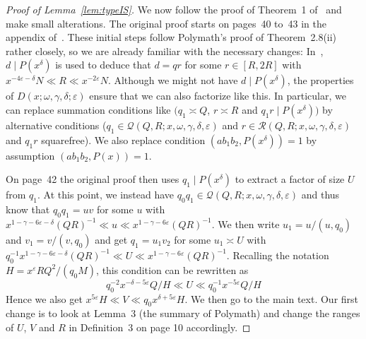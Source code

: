 \documentclass{amsart}
\numberwithin{equation}{section}
\begin{document}
\begin{proof}[Proof of Lemma~\ref{lem:typeIS}]
We now follow the proof of Theorem~1 of~\cite{Stadlmann:2023:PAP} and make   small alterations. The original proof starts on  pages~40 to~43 in the appendix of~\cite{Stadlmann:2023:PAP}. These initial steps follow Polymath's proof of Theorem~2.8(ii) rather closely, so we are already familiar with the necessary changes: In~\cite{Stadlmann:2023:PAP},  $d \mid P(x^\delta)$ is used to deduce that $d=qr$ for some $r \in [R,2R]$ with $x^{-4\varepsilon-\delta}N \ll R \ll x^{-2\varepsilon}N$. Although we might not have   $d \mid P(x^\delta)$,   the properties of $D(x;\omega,\gamma,\delta;\varepsilon)$  ensure that we can also factorize like this. In particular, we  can  replace summation conditions like $(q_1 \asymp Q$, $r \asymp R$ and $q_1r \mid P(x^\delta))$ by alternative conditions ($q_1 \in  \mathcal{Q}(Q,R;x,\omega,\gamma,\delta,\varepsilon)$ and $r \in \mathcal{R}(Q,R;x,\omega,\gamma,\delta,\varepsilon)$ and $q_1r$ squarefree).  We also replace condition $(ab_1b_2,P(x^\delta))=1$ by   assumption $(ab_1b_2, P(x))=1$.

\medskip On page~42 the original proof then uses $q_1 \mid P(x^\delta)$ to extract a factor of size $U$ from $q_1$. At this point, we instead have  $q_0q_1 \in  \mathcal{Q}(Q,R;x,\omega,\gamma,\delta,\varepsilon)$ and thus know that $q_0q_1 = u  v $ for some $u$ with  $ x^{1-\gamma-6\varepsilon-\delta}   (QR)^{-1} \ll u \ll x^{1-\gamma-6\varepsilon}   (QR)^{-1}$. We then write $u_1 =u/(u,q_0)$ and $v_1=v/(v,q_0)$ and get $q_1 = u_1 v_2$    for some $u_1 \asymp U$  with  $ q_0^{-1}x^{1-\gamma-6\varepsilon-\delta}   (QR)^{-1} \ll U \ll x^{1-\gamma-6\varepsilon}   (QR)^{-1}$. Recalling the notation $H=x^\varepsilon RQ^2/(q_0 M)$, this condition can be rewritten as 
 $$ q_0^{-2}x^{-\delta - 5\varepsilon} Q/H \ll U \ll q_0^{-1}x^{ - 5\varepsilon} Q/H$$
 Hence we also get  $x^{5\varepsilon} H \ll V \ll q_0 x^{\delta+5\varepsilon} H$. 
We then go to the main text. Our first change is to look at Lemma~3 (the summary of Polymath) and change the ranges of $U$, $V$ and $R$ in Definition~3 on page 10 accordingly.  


\end{proof}
\end{document}
